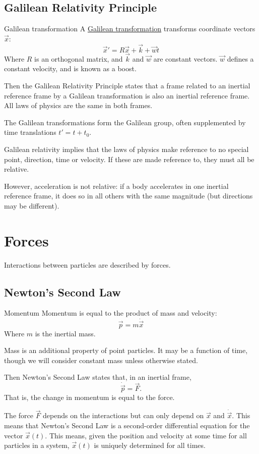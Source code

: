 \documentclass[../Main.tex]{subfiles}
\begin{document}
\subsection{Galilean Relativity Principle}
\begin{definition}{Galilean transformation}
    A \underline{Galilean transformation} transforms coordinate vectors $\vec{x}$:
    \begin{equation}
        \vec{x}' = R\vec{x} + \vec{k} + \vec{w}t
        \label{eqnGalileanTransform}
    \end{equation}
    Where $R$ is an orthogonal matrix, and $\vec{k}$ and $\vec{w}$ are constant vectors. $\vec{w}$ defines a constant velocity, and is known as a boost.
\end{definition}
Then the Galilean Relativity Principle states that a frame related to an inertial reference frame by a Galilean transformation is also an inertial reference frame. All laws of physics are the same in both frames.\par
The Galilean transformations form the Galilean group, often supplemented by time translations $t' = t + t_0$.\par
Galilean relativity implies that the laws of physics make reference to no special point, direction, time or velocity. If these are made reference to, they must all be relative.\par
However, acceleration is not relative: if a body accelerates in one inertial reference frame, it does so in all others with the same magnitude (but directions may be different).
\section{Forces}
Interactions between particles are described by forces.
\subsection{Newton's Second Law}
\begin{definition}{Momentum}
    Momentum is equal to the product of mass and velocity:
    \begin{equation*}
        \vec{p} = m \dot{\vec{x}}
    \end{equation*}
    Where $m$ is the inertial mass.
\end{definition}
Mass is an additional property of point particles. It may be a function of time, though we will consider constant mass unless otherwise stated.\par
Then Newton's Second Law states that, in an inertial frame,
\begin{equation}
    \dot{\vec{p}} = \vec{F}.
    \label{eqnNewtonII}
\end{equation}
That is, the change in momentum is equal to the force.\par
The force $\vec{F}$ depends on the interactions but can only depend on $\vec{x}$ and $\dot{\vec{x}}$. This means that Newton's Second Law is a second-order differential equation for the vector $\vec{x}(t)$. This means, given the position and velocity at some time for all particles in a system, $\vec{x}(t)$ is uniquely determined for all times.
\end{document}
